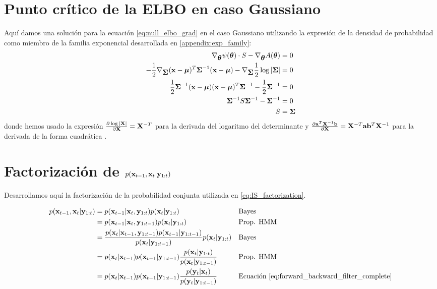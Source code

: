 \section{Punto crítico de la ELBO en caso Gaussiano}\label{appendix:null_grad_elbo}

Aquí damos una solución para la ecuación \ref{eq:null_elbo_grad} en el caso Gaussiano utilizando la expresión de la densidad de probabilidad como miembro de la familia exponencial desarrollada en \ref{appendix:exp_family}:
\begin{align*}
    \nabla_{\mbox{\boldmath$ \theta $}} \psi(\mbox{\boldmath$ \theta $}) \cdot S - \nabla_{\mbox{\boldmath$ \theta $}} A(\mbox{\boldmath$ \theta $}) &= 0 \\
    -\frac{1}{2} \nabla_{\mbox{\boldmath$ \Sigma $}}  (\mathbf{x}- \mbox{\boldmath$ \mu $})^T \mbox{\boldmath$ \Sigma $}^{-1}(\mathbf{x}-\mbox{\boldmath$ \mu $}) - \nabla_{\mbox{\boldmath$ \Sigma $}} \frac{1}{2} \log |\mbox{\boldmath$ \Sigma $}| &= 0 \\
    \frac{1}{2} \mbox{\boldmath$ \Sigma $}^{-1} (\mathbf{x}- \mbox{\boldmath$ \mu $})(\mathbf{x}-\mbox{\boldmath$ \mu $})^T \mbox{\boldmath$ \Sigma $}^{-1} - \frac{1}{2} \mbox{\boldmath$ \Sigma $}^{-1} &= 0 \\
    \mbox{\boldmath$ \Sigma $}^{-1} S \mbox{\boldmath$ \Sigma $}^{-1} - \mbox{\boldmath$ \Sigma $}^{-1} &= 0 \\
    S &= \mbox{\boldmath$ \Sigma $} 
\end{align*}
donde hemos usado la expresión $\frac{\partial \log|\mathbf{X}|}{\partial \mathbf{X}} = \mathbf{X}^{-T}$ para la derivada del logaritmo del determinante y $\frac{\partial \mathbf{a}^T \mathbf{X}^{-1} \mathbf{b} }{\partial \mathbf{X}} = \mathbf{X}^{-T} \mathbf{a} \mathbf{b}^T \mathbf{X}^{-1}$ para la derivada de la forma cuadrática \cite{Petersen2012}.

\section{Factorización de $p(\mathbf{x}_{t-1}, \mathbf{x}_t| \mathbf{y}_{1:t})$} \label{appendix:IS_factorization}

Desarrollamos aquí la factorización de la probabilidad conjunta utilizada en \ref{eq:IS_factorization}.

\begin{align}
    p(\mathbf{x}_{t-1}, \mathbf{x}_t| \mathbf{y}_{1:t}) &= p(\mathbf{x}_{t-1} | \mathbf{x}_t, \mathbf{y}_{1:t}) p(\mathbf{x}_t| \mathbf{y}_{1:t}) && \text{Bayes} \\
    &= p(\mathbf{x}_{t-1} | \mathbf{x}_t, \mathbf{y}_{1:t-1}) p(\mathbf{x}_t| \mathbf{y}_{1:t}) && \text{Prop. HMM} \\
    &= \frac{p(\mathbf{x}_t| \mathbf{x}_{t-1}, \mathbf{y}_{1:t-1})p(\mathbf{x}_{t-1} | \mathbf{y}_{1:t-1})}{p(\mathbf{x}_t |\mathbf{y}_{1:t-1})} p(\mathbf{x}_t| \mathbf{y}_{1:t}) && \text{Bayes} \\
    &= p(\mathbf{x}_t| \mathbf{x}_{t-1})p(\mathbf{x}_{t-1} | \mathbf{y}_{1:t-1})\frac{p(\mathbf{x}_t| \mathbf{y}_{1:t})}{p(\mathbf{x}_t |\mathbf{y}_{1:t-1})} && \text{Prop. HMM} \\
    &= p(\mathbf{x}_t| \mathbf{x}_{t-1})p(\mathbf{x}_{t-1} | \mathbf{y}_{1:t-1})\frac{p(\mathbf{y}_t| \mathbf{x}_t)}{p(\mathbf{y}_t |\mathbf{y}_{1:t-1})} && \text{Ecuación \ref{eq:forward_backward_filter_complete}}
\end{align}

